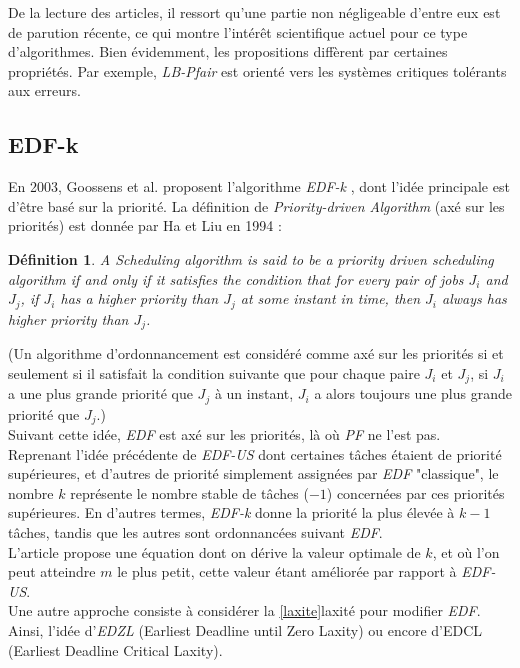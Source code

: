 \documentclass[11pt,a4paper,oneside]{report}
\newtheorem{mydef}{Définition}
\begin{document}
De la lecture des articles, il ressort qu'une partie non négligeable d'entre eux 
est de parution récente, ce qui montre l'intérêt scientifique actuel pour ce type d'algorithmes. 
Bien évidemment, les propositions diffèrent par certaines propriétés. Par exemple, 
\textit{LB-Pfair} est orienté vers les systèmes critiques tolérants aux erreurs. 

\subsection{EDF-k}

En 2003, Goossens et al. proposent l'algorithme \textit{EDF-k} \cite{goossens_priority-driven_2003}, 
dont l'idée principale est d'être basé sur la priorité. 
La définition de \textit{Priority-driven Algorithm} (axé sur les priorités) 
est donnée par Ha et Liu en 1994 :
\begin{mydef}
	A Scheduling algorithm is said to be a priority driven scheduling algorithm if and 
	only if it satisfies the condition 
	that for every pair of jobs $J_i$ and $J_j$, if $J_i$ has a higher priority than $J_j$ at 
	some instant in time, then $J_i$ always has higher priority than $J_j$.
\end{mydef}
(Un algorithme d'ordonnancement est considéré comme axé sur les priorités si et seulement si il 
satisfait la condition suivante que pour chaque paire $J_i$ et $J_j$, si $J_i$ a une plus 
grande priorité que $J_j$ à un instant, $J_i$ a alors toujours une plus grande priorité 
que $J_j$.)\\
Suivant cette idée, \textit{EDF} est axé sur les priorités, là où \textit{PF} ne l'est pas.\\

Reprenant l'idée précédente de \textit{EDF-US} dont certaines tâches étaient de priorité 
supérieures, et d'autres de priorité simplement assignées par \textit{EDF} "classique", 
le nombre $k$ représente le nombre stable de tâches ($-1$) concernées par ces priorités 
supérieures. En d'autres termes, \textit{EDF-k} donne la priorité la plus élevée à 
$k - 1$ tâches, tandis que les autres sont ordonnancées suivant \textit{EDF}.\\

L'article propose une équation dont on dérive la valeur optimale de $k$, et où l'on peut 
atteindre $m$ le plus petit, cette valeur étant améliorée par rapport à \textit{EDF-US}.\\

Une autre approche consiste à considérer la \ref{laxite}{laxité} pour modifier \textit{EDF}. 
Ainsi, l'idée d'\textit{EDZL} (Earliest Deadline until Zero Laxity) \cite{cirinei_edzl_2007} ou encore d'EDCL \cite{kato_real-time_2007}
(Earliest Deadline Critical Laxity). \\
\end{document}
